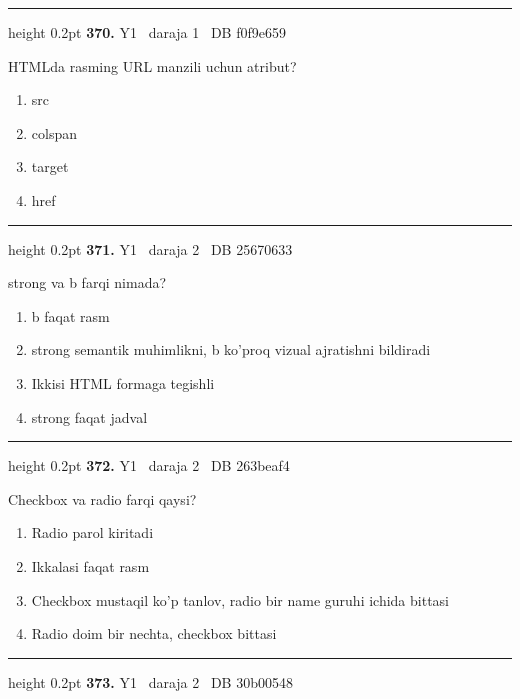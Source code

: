 \documentclass[10pt,a4paper,oneside]{article}
\begin{document}
\vspace{2mm}\hrule height 0.2pt \vspace{4mm}
\hypertarget{q370}{\textbf{\color{ink}370.}}  {\color{muted}\scriptsize Y1 \textbullet\ daraja 1 \textbullet\ DB f0f9e659}
\par
HTMLda rasming URL manzili uchun atribut?
\begin{enumerate}[label=\Alph*),leftmargin=9mm]
\item src
\item colspan
\item target
\item href
\end{enumerate}
\vspace{2mm}\hrule height 0.2pt \vspace{4mm}
\hypertarget{q371}{\textbf{\color{ink}371.}}  {\color{muted}\scriptsize Y1 \textbullet\ daraja 2 \textbullet\ DB 25670633}
\par
strong va b farqi nimada?
\begin{enumerate}[label=\Alph*),leftmargin=9mm]
\item b faqat rasm
\item strong semantik muhimlikni, b ko'proq vizual ajratishni bildiradi
\item Ikkisi HTML formaga tegishli
\item strong faqat jadval
\end{enumerate}
\vspace{2mm}\hrule height 0.2pt \vspace{4mm}
\hypertarget{q372}{\textbf{\color{ink}372.}}  {\color{muted}\scriptsize Y1 \textbullet\ daraja 2 \textbullet\ DB 263beaf4}
\par
Checkbox va radio farqi qaysi?
\begin{enumerate}[label=\Alph*),leftmargin=9mm]
\item Radio parol kiritadi
\item Ikkalasi faqat rasm
\item Checkbox mustaqil ko'p tanlov, radio bir name guruhi ichida bittasi
\item Radio doim bir nechta, checkbox bittasi
\end{enumerate}
\vspace{2mm}\hrule height 0.2pt \vspace{4mm}
\hypertarget{q373}{\textbf{\color{ink}373.}}  {\color{muted}\scriptsize Y1 \textbullet\ daraja 2 \textbullet\ DB 30b00548}
\end{document}
